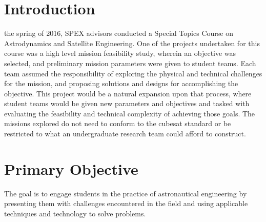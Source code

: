 \documentclass[conference]{IEEEtran} %
\begin{document}

\section{Introduction}
\label{sec:introduction}

 the spring of 2016, SPEX advisors conducted a Special Topics Course on Astrodynamics and Satellite Engineering.
One of the projects undertaken for this course was a high level mission feasibility study, wherein an objective was selected, and preliminary mission parameters were given to student teams.
Each team assumed the responsibility of exploring the physical and technical challenges for the mission, and proposing solutions and designs for accomplishing the objective.
This project would be a natural expansion upon that process, where student teams would be given new parameters and objectives and tasked with evaluating the feasibility and technical complexity of achieving those goals.
The missions explored do not need to conform to the cubesat standard or be restricted to what an undergraduate research team could afford to construct.

\section{Primary Objective}
\label{sec:primary-obj}

The goal is to engage students in the practice of astronautical engineering by presenting them with challenges encountered in the field and using applicable techniques and technology to solve problems.
\end{document}
